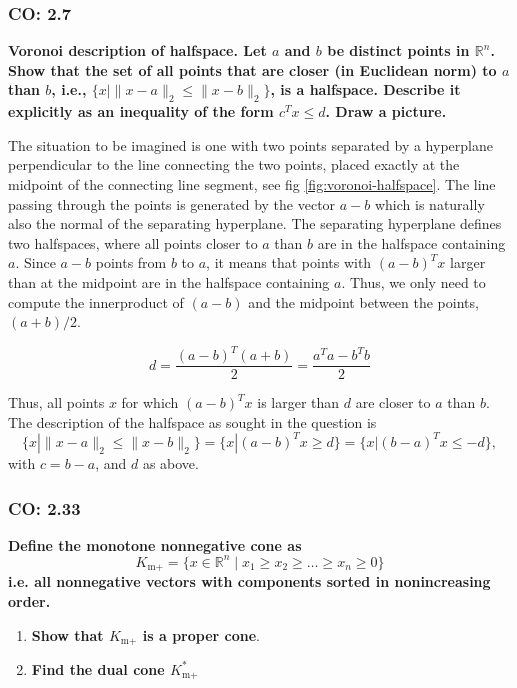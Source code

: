 

\subsubsection{CO: 2.7}
\textbf{Voronoi description of halfspace. Let $a$ and $b$ be distinct points in $\mathbb{R}^n$. Show that the set
of all points that are closer (in Euclidean norm) to $a$ than $b$, i.e., $\{x | \|x-a\|_2 \leq \|x-b\|_2\}$,
is a halfspace. Describe it explicitly as an inequality of the form $c^T x \leq d$. Draw a picture.}

The situation to be imagined is one with two points separated by a hyperplane perpendicular to the line connecting the two points, placed exactly at the midpoint of the connecting line segment, see fig \ref{fig:voronoi-halfspace}.
The line passing through the points is generated by the vector $a-b$ which is naturally also the normal of the separating hyperplane.
The separating hyperplane defines two halfspaces, where all points closer to $a$ than $b$ are in the halfspace containing $a$.
Since $a-b$ points from $b$ to $a$, it means that points with $(a - b)^T x$ larger than at the midpoint are in the halfspace containing $a$.
Thus, we only need to compute the innerproduct of $(a - b)$ and the midpoint between the points, $(a + b) / 2$.



\[
    d = \frac{(a - b)^T(a + b)}{2} = \frac{a^Ta - b^Tb}{2}
\]

Thus, all points $x$ for which $(a-b)^T x$ is larger than $d$ are closer to $a$ than $b$.
The description of the halfspace as sought in the question is
\[
    \{x | \|x-a\|_2 \leq \|x-b\|_2\}
    = \{x | (a-b)^T x \geq d\}
    = \{x | (b-a)^T x \leq -d\},
\]
with $c = b - a$, and $d$ as above.

\subsubsection{CO: 2.33}
\textbf{Define the monotone nonnegative cone as}
\[
    K_{\text{m}+} = \{x \in \mathbb{R}^n \mid x_1 \geq x_2 \geq \dots \geq x_n \geq 0 \}
\]
\textbf{i.e. all nonnegative vectors with components sorted in nonincreasing order.}
\begin{enumerate}
    \item[\textbf{(a)}] \textbf{Show that $K_{\text{m}+}$ is a proper cone}.
    \item[\textbf{(b)}] \textbf{Find the dual cone $K_{\text{m}+}^*$}
\end{enumerate}

